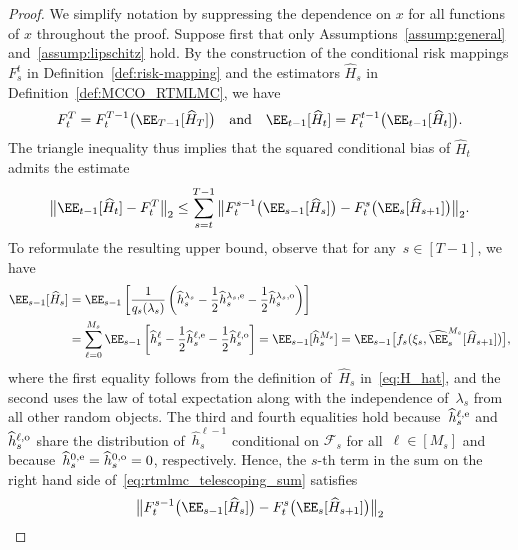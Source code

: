 \documentclass[11pt]{article}
\let\hat\widehat
\begin{document}
\begin{proof}
We simplify notation by suppressing the dependence on $x$ for all functions of $x$ throughout the proof. Suppose first that only Assumptions~\ref{assump:general} and~\ref{assump:lipschitz} hold. By the construction of the conditional risk mappings $F_s^t$ in Definition~\ref{def:risk-mapping} and the estimators $\hat H_s$ in Definition~\ref{def:MCCO_RTMLMC}, we have
\begin{align*}
    F_t^T = F_t^{T-1}\big(\EE_{T-1}[\hat{H}_{T}]\big) \quad \text{and}\quad \EE_{t-1}[\hat{H}_{t}]=F_t^{t-1}\big(\EE_{t-1}[\hat{H}_{t}]\big).
\end{align*}
The triangle inequality thus implies that the squared conditional bias of $\hat H_t$ admits the estimate
\begin{align}
    \label{eq:rtmlmc_telescoping_sum}
    \big\| \EE_{t-1}[\hat{H}_{t}] - F_t^T \big\|_2 \leq \sum_{s=t}^{T-1}\big\| F_t^{s-1}\big(\EE_{s-1}[\hat{H}_s]\big) - F_t^s\big(\EE_s[\hat{H}_{s+1}]\big)\big\|_2.
\end{align}
To reformulate the resulting upper bound, observe that for any~$s \in [T-1]$, we have
\begin{equation}
    \label{eq:rtmlmc_bias}
    \begin{aligned}
    \EE_{s-1}[\hat{H}_s] & = \EE_{s-1} \left[ \frac{1}{q_{s}(\lambda_{s})}\left( \hat{h}_s^{\lambda_s} -\frac{1}{2}\hat{h}_s^{\lambda_s, {\rm e}}-\frac{1}{2}\hat{h}_s^{\lambda_s,{\rm o}} \right)\right] \\
    & = \sum_{\ell=0}^{M_s} \EE_{s-1} \left[ \hat{h}_s^{\ell} -\frac{1}{2}\hat{h}_s^{\ell, {\rm e}}-\frac{1}{2}\hat{h}_s^{\ell,{\rm o}} \right] = \EE_{s-1}[\hat{h}_s^{M_s}] 
    = \EE_{s-1}\big[f_s(\xi_s, \hat\EE_s^{M_s}[\hat{H}_{s+1}])\big],
\end{aligned}
\end{equation}
where the first equality follows from the definition of~$\hat H_s$ in~\eqref{eq:H_hat}, and the second uses the law of total expectation along with the independence of~$\lambda_s$ from all other random objects. The third and fourth equalities hold because~$\hat{h}_s^{\ell,{\rm e}}$ and~$\hat{h}_s^{\ell,{\rm o}}$ share the distribution of~$\hat{h}_s^{\ell-1}$ conditional on $\mathcal F_s$ for all~$\ell \in [M_s]$ and because~$\hat{h}_s^{0,{\rm e}} = \hat{h}_s^{0,{\rm o}} = 0$, respectively. Hence, the $s$-th term in the sum on the right hand side of~\eqref{eq:rtmlmc_telescoping_sum} satisfies
\begin{align*}
    & \big\| F_t^{s-1}\big(\EE_{s-1}[\hat{H}_s]\big) - F_t^s\big(\EE_s[\hat{H}_{s+1}]\big)\big\|_2\\

\end{align*}
\end{proof}
\end{document}
